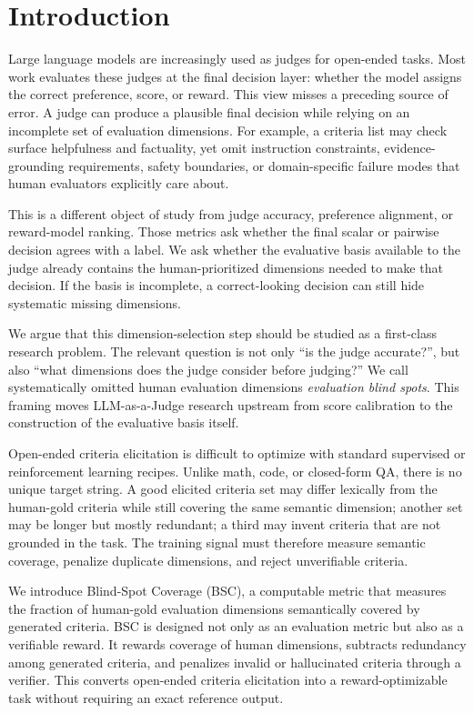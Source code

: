 \section{Introduction}

Large language models are increasingly used as judges for open-ended tasks.
Most work evaluates these judges at the final decision layer: whether the model
assigns the correct preference, score, or reward. This view misses a preceding
source of error. A judge can produce a plausible final decision while relying
on an incomplete set of evaluation dimensions. For example, a criteria list may check
surface helpfulness and factuality, yet omit instruction constraints,
evidence-grounding requirements, safety boundaries, or domain-specific failure
modes that human evaluators explicitly care about.

This is a different object of study from judge accuracy, preference alignment,
or reward-model ranking. Those metrics ask whether the final scalar or pairwise
decision agrees with a label. We ask whether the evaluative basis available to
the judge already contains the human-prioritized dimensions needed to make that
decision. If the basis is incomplete, a correct-looking decision can still hide
systematic missing dimensions.

We argue that this dimension-selection step should be studied as a first-class
research problem. The relevant question is not only ``is the judge accurate?'',
but also ``what dimensions does the judge consider before judging?'' We call
systematically omitted human evaluation dimensions \emph{evaluation blind
spots}. This framing moves LLM-as-a-Judge research upstream from score
calibration to the construction of the evaluative basis itself.

Open-ended criteria elicitation is difficult to optimize with standard supervised
or reinforcement learning recipes. Unlike math, code, or closed-form QA, there
is no unique target string. A good elicited criteria set may differ lexically
from the human-gold criteria while still covering the same semantic dimension; another
set may be longer but mostly redundant; a third may invent criteria that are
not grounded in the task. The training signal must therefore measure semantic
coverage, penalize duplicate dimensions, and reject unverifiable criteria.

We introduce Blind-Spot Coverage (BSC), a computable metric that measures the
fraction of human-gold evaluation dimensions semantically covered by generated
criteria. BSC is designed not only as an evaluation metric but also as a
verifiable reward. It rewards coverage of human dimensions, subtracts
redundancy among generated criteria, and penalizes invalid or hallucinated
criteria through a verifier. This converts open-ended criteria elicitation into a
reward-optimizable task without requiring an exact reference output.

